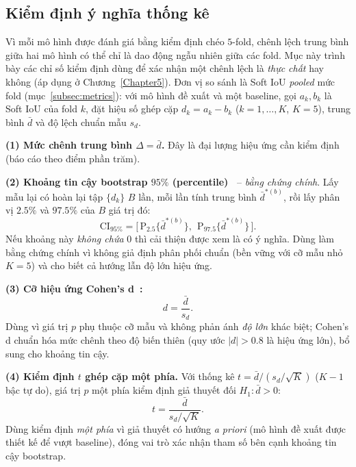 \subsection{Kiểm định ý nghĩa thống kê}
\label{subsec:stat_test}
Vì mỗi mô hình được đánh giá bằng kiểm định chéo $5$-fold, chênh lệch trung bình giữa hai mô hình có thể chỉ là dao động ngẫu nhiên giữa các fold. Mục này trình bày các chỉ số kiểm định dùng để xác nhận một chênh lệch là \emph{thực chất} hay không (áp dụng ở Chương~\ref{Chapter5}). Đơn vị so sánh là Soft IoU \emph{pooled} mức fold (mục~\ref{subsec:metrics}): với mô hình đề xuất và một baseline, gọi $a_k, b_k$ là Soft IoU của fold $k$, đặt hiệu số ghép cặp $d_k = a_k - b_k$ ($k=1,\dots,K$, $K=5$), trung bình $\bar d$ và độ lệch chuẩn mẫu $s_d$.

\noindent\textbf{(1) Mức chênh trung bình $\Delta = \bar d$.} Đây là đại lượng hiệu ứng cần kiểm định (báo cáo theo điểm phần trăm).

\noindent\textbf{(2) Khoảng tin cậy bootstrap $95\%$ (percentile)~\cite{efron1993bootstrap}} -- \emph{bằng chứng chính}. Lấy mẫu lại có hoàn lại tập $\{d_k\}$ $B$ lần, mỗi lần tính trung bình $\bar d^{*(b)}$, rồi lấy phân vị $2.5\%$ và $97.5\%$ của $B$ giá trị đó:
\begin{equation}
    \text{CI}_{95\%} = \big[\, \mathrm{P}_{2.5}\{\bar d^{*(b)}\},\ \ \mathrm{P}_{97.5}\{\bar d^{*(b)}\} \,\big].
\end{equation}
Nếu khoảng này \emph{không chứa} $0$ thì cải thiện được xem là có ý nghĩa. Dùng làm bằng chứng chính vì không giả định phân phối chuẩn (bền vững với cỡ mẫu nhỏ $K=5$) và cho biết cả hướng lẫn độ lớn hiệu ứng.

\noindent\textbf{(3) Cỡ hiệu ứng Cohen's d~\cite{cohen1988power}:}
\begin{equation}
    d = \frac{\bar d}{s_d}.
\end{equation}
Dùng vì giá trị $p$ phụ thuộc cỡ mẫu và không phản ánh \emph{độ lớn} khác biệt; Cohen's d chuẩn hóa mức chênh theo độ biến thiên (quy ước $|d|>0.8$ là hiệu ứng lớn), bổ sung cho khoảng tin cậy.

\noindent\textbf{(4) Kiểm định $t$ ghép cặp một phía.} Với thống kê $t = \bar d / (s_d/\sqrt{K})$ ($K-1$ bậc tự do), giá trị $p$ một phía kiểm định giả thuyết đối $H_1: \bar d > 0$:
\begin{equation}
    t = \frac{\bar d}{s_d/\sqrt{K}}.
\end{equation}
Dùng kiểm định \emph{một phía} vì giả thuyết có hướng \emph{a priori} (mô hình đề xuất được thiết kế để vượt baseline), đóng vai trò xác nhận tham số bên cạnh khoảng tin cậy bootstrap.

